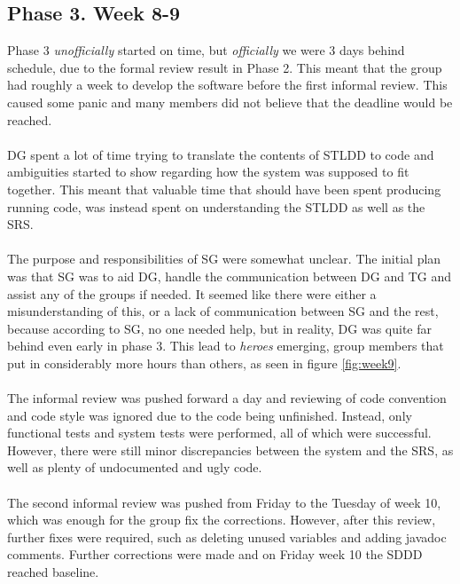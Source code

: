 \documentclass{article}
\begin{document}
    \subsection{Phase 3. Week 8-9 \label{phase3}}
        Phase 3 \emph{unofficially} started on time, but \emph{officially} we were 3 days behind schedule, due to
        the formal review result in Phase 2. This meant that the group had roughly a week to develop the software
        before the first informal review. This caused some panic and many members did not believe that the
        deadline would be reached.
        \\ \\
        DG spent a lot of time trying to translate the contents of STLDD to code
        and ambiguities started to show regarding how the system was supposed to fit together.
        This meant that valuable time that should have been spent producing running code, was
        instead spent on understanding the STLDD as well as the SRS.
        \\ \\
        The purpose and responsibilities of SG were somewhat unclear. The initial plan was that SG
        was to aid DG, handle the communication between DG and TG and assist any of the
        groups if needed. It seemed like there were either a misunderstanding of this, or a lack of
        communication between SG and the rest, because according  to SG, no one needed help, but in
        reality, DG was quite far behind even early in phase 3.
        This lead to \emph{heroes}
        emerging, group members that put in considerably more hours than others, as seen in figure \ref{fig:week9}.
        \\ \\
        The informal review was pushed forward a day and reviewing of code
        convention and code style was ignored due to the code being unfinished. Instead, only
        functional tests and system tests were performed, all of which were successful. However, there
        were still minor discrepancies between the system and the SRS, as well as plenty of
        undocumented and ugly code. 
        \\ \\
        The second informal review was pushed from Friday to the Tuesday of week 10, which was enough
        for the group fix the corrections. However, after this review, further fixes were required,
        such as deleting unused variables and adding javadoc comments. Further corrections were made and on Friday week 10 the SDDD reached baseline.
        
\end{document}
